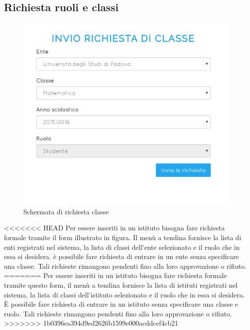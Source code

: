 \documentclass[a4paper, titlepage]{article}
\begin{document}
	\newpage
	\subsection{Richiesta ruoli e classi}
	\begin{figure}[!h]
		\centering
		\includegraphics[scale=0.33]{Img/screen_RichiestaClasse.png}
		\caption{Schermata di richiesta classe}
	\end{figure}
<<<<<<< HEAD
	Per essere inseriti in un istituto bisogna fare richiesta formale tramite il form illustrato in figura. Il menù a tendina fornisce la lista di enti registrati nel sistema, la lista di classi dell'ente selezionato e il ruolo che in essa si desidera. è possibile fare richiesta di entrare in un ente senza specificare una classe. Tali richieste rimangono pendenti fino alla loro approvazione o rifiuto.
=======
	Per essere inseriti in un istituto bisogna fare richiesta formale tramite questo form, il menù a tendina fornisce la lista di istituti registrati nel sistema, la lista di classi dell'istituto selezionato e il ruolo che in essa si desidera. È possibile fare richiesta di entrare in un istituto senza specificare una classe e ruolo. Tali richieste rimangono pendenti fino alla loro approvazione o rifiuto.
>>>>>>> 1b0396ea394d9ed2626b1599e000acddcef4cb21
	
	 
\end{document}
